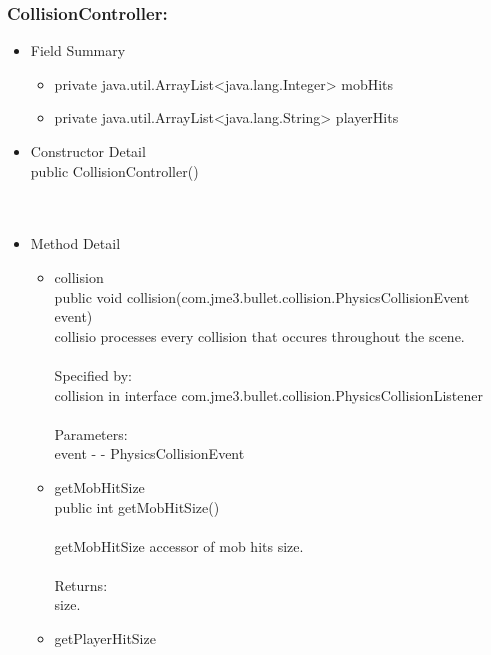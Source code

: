 \documentclass[letterpaper]{article}
\begin{document}
					\vspace{0.2in}
					\subsubsection*{CollisionController:}
					\vspace{0.1in}	
						\begin{itemize}
							\item	Field Summary
									\begin{itemize}
										\item	private java.util.ArrayList<java.lang.Integer>	mobHits 
										\item	private java.util.ArrayList<java.lang.String>	playerHits 
									\end{itemize}
							\item	Constructor Detail \\
									public CollisionController() \\ \\ \\
							\item	Method Detail
									\begin{itemize}
										\item	collision \\
												public void collision(com.jme3.bullet.collision.PhysicsCollisionEvent event) \\
												collisio processes every collision that occures throughout the scene. \\ \\
												Specified by: \\
												collision in interface com.jme3.bullet.collision.PhysicsCollisionListener \\ \\
												Parameters: \\
												event - - PhysicsCollisionEvent \\
										\item	getMobHitSize \\
												public int getMobHitSize() \\ \\
												getMobHitSize accessor of mob hits size. \\ \\
												Returns: \\
												size. \\
										\item	getPlayerHitSize \\

\end{itemize}
\end{itemize}
\end{document}
